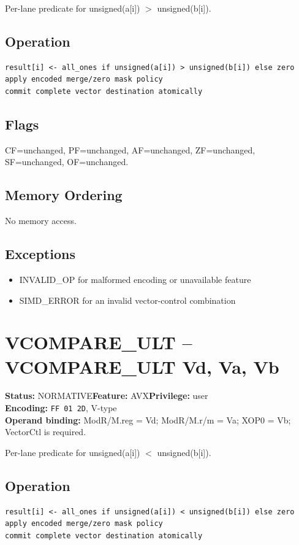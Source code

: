 \documentclass[10pt]{article}
\begin{document}
Per-lane predicate for unsigned(a[i]) $>$ unsigned(b[i]).

\subsection*{Operation}
\begin{lstlisting}
result[i] <- all_ones if unsigned(a[i]) > unsigned(b[i]) else zero
apply encoded merge/zero mask policy
commit complete vector destination atomically
\end{lstlisting}
\subsection*{Flags}
CF=unchanged, PF=unchanged, AF=unchanged, ZF=unchanged, SF=unchanged, OF=unchanged.
\subsection*{Memory Ordering}
No memory access.
\subsection*{Exceptions}
\begin{itemize}
\item INVALID\_OP for malformed encoding or unavailable feature
\item SIMD\_ERROR for an invalid vector-control combination
\end{itemize}
\clearpage

\section{VCOMPARE\_ULT -- VCOMPARE\_ULT Vd, Va, Vb}
\textbf{Status:} NORMATIVE\quad \textbf{Feature:} AVX\quad \textbf{Privilege:} user\\
\textbf{Encoding:} \texttt{FF 01 2D}, V-type\\
\textbf{Operand binding:} ModR/M.reg = Vd; ModR/M.r/m = Va; XOP0 = Vb; VectorCtl is required.

Per-lane predicate for unsigned(a[i]) $<$ unsigned(b[i]).

\subsection*{Operation}
\begin{lstlisting}
result[i] <- all_ones if unsigned(a[i]) < unsigned(b[i]) else zero
apply encoded merge/zero mask policy
commit complete vector destination atomically
\end{lstlisting}
\end{document}
